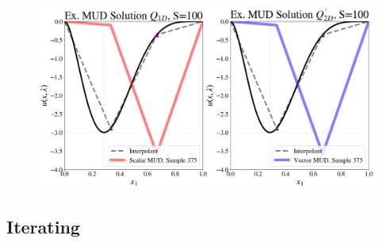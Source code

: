 \begin{frame}

\begin{figure}
  \includegraphics[width=0.95\linewidth]{figures/pde-highd/pde-highd_comp_exmud_D2_m100.png}
\label{fig:pde-highd-2d-scalar-vs-alt}
\end{figure}

\end{frame}


\subsection{Iterating}

